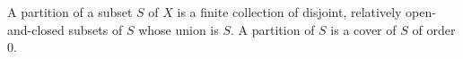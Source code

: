 A partition of a subset $S$ of $X$ is a finite collection of disjoint, relatively open-and-closed subsets of $S$ whose union is $S$. A partition of $S$ is a cover of $S$ of order $0$.
